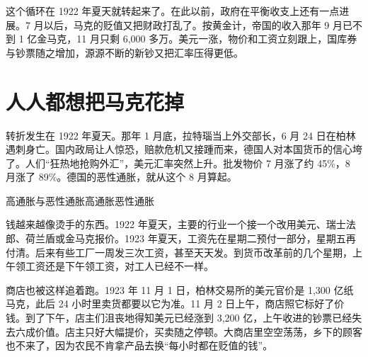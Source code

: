 这个循环在 1922 年夏天就转起来了。在此以前，政府在平衡收支上还有一点进展。7 月以后，马克的贬值又把财政打乱了\cite{bresciani1937}。按黄金计，帝国的收入那年 9 月已不到 1 亿金马克，11 月只剩 6,000 多万。美元一涨，物价和工资立刻跟上，国库券与钞票随之增加，源源不断的新钞又把汇率压得更低\cite{bresciani1937}。

\section{人人都想把马克花掉}\label{sec:weimar-demand}

转折发生在 1922 年夏天。那年 1 月底，拉特瑙当上外交部长，6 月 24 日在柏林遇刺身亡\cite{rathenau2003}。国内政局让人惊恐，赔款危机又接踵而来，德国人对本国货币的信心垮了。人们“狂热地抢购外汇”，美元汇率突然上升\cite{bresciani1937}。批发物价 7 月涨了约 45\%，8 月涨了 89\%\cite{sargent1982}。德国的恶性通胀，就从这个 8 月算起。

\begin{compare}{高通胀与恶性通胀}{高通胀}{恶性通胀}
\end{compare}

钱越来越像烫手的东西。1922 年夏天，主要的行业一个接一个改用美元、瑞士法郎、荷兰盾或金马克报价\cite{bresciani1937}。1923 年夏天，工资先在星期二预付一部分，星期五再付清。后来有些工厂一周发三次工资，甚至天天发。到货币改革前的几个星期，上午领工资还是下午领工资，对工人已经不一样\cite{bresciani1937}。

商店也被这样追着跑。1923 年 11 月 1 日，柏林交易所的美元官价是 1,300 亿纸马克，此后 24 小时里卖货都要以它为准。11 月 2 日上午，商店照它标好了价钱。到了下午，店主们沮丧地得知美元已经涨到 3,200 亿，上午收进的钞票已经失去六成价值\cite{bresciani1937}。店主只好大幅提价，买卖随之停顿。大商店里空空荡荡，乡下的顾客也不来了，因为农民不肯拿产品去换“每小时都在贬值的钱”\cite{bresciani1937}。

